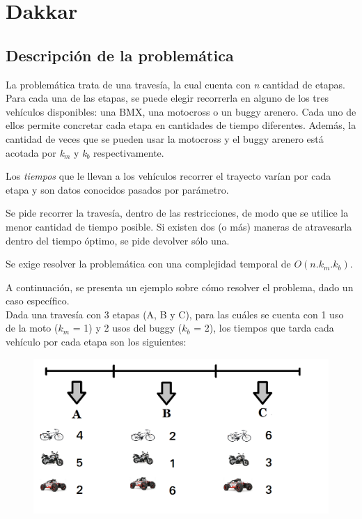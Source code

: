 \section{Dakkar}
\subsection{Descripci\'on de la problem\'atica}
La problem\'atica trata de una traves\'ia, la cual cuenta con \emph{n} cantidad de etapas. Para cada una de las etapas, se puede elegir recorrerla en alguno de los tres veh\'iculos disponibles: una BMX, una motocross o un buggy arenero. Cada uno de ellos permite concretar cada etapa en cantidades de tiempo diferentes.
Adem\'as, la cantidad de veces que se pueden usar la motocross y el buggy arenero est\'a acotada por \emph{k}$_m$ y \emph{k}$_b$ respectivamente.

Los \emph{tiempos} que le llevan a los veh\'iculos recorrer el trayecto var\'ian por cada etapa y son datos conocidos pasados por par\'ametro.

Se pide recorrer la traves\'ia, dentro de las restricciones, de modo que se utilice la menor cantidad de tiempo posible. Si existen dos (o m\'as) maneras de atravesarla dentro del tiempo
\'optimo, se pide devolver s\'olo una.

Se exige resolver la problem\'atica con una complejidad temporal de $O(n.k_m.k_b)$.\\

\bigskip

A continuaci\'on, se presenta un ejemplo sobre c\'omo resolver el problema, dado un caso espec\'ifico.\\

Dada una traves\'ia con 3 etapas (A, B y C), para las cu\'ales se cuenta con 1 uso de la moto ($k_m$ = 1) y 2 usos del buggy ($k_b$ = 2), los tiempos que tarda cada veh\'iculo por cada etapa son los siguientes: \\

  \begin{figure}[h!]
   \begin{center}
 	\includegraphics[scale=0.4]{imagenes/ej1/ejemplo.png}
   \end{center}
 \end{figure}

